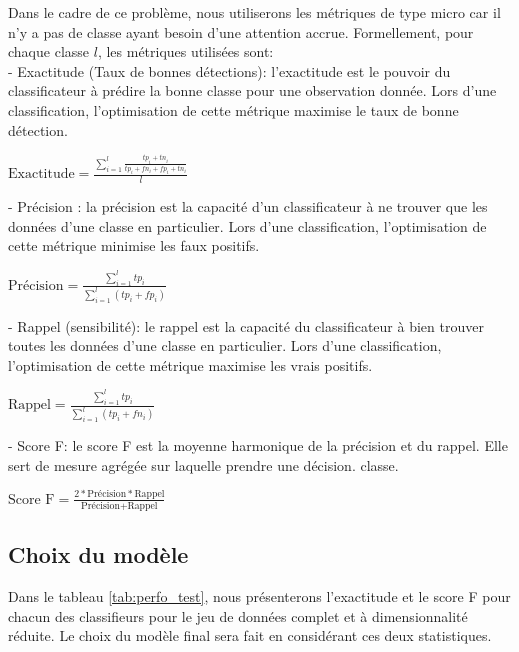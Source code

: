 Dans le cadre de ce problème, nous utiliserons les métriques de type micro car il n'y a pas de classe ayant besoin d'une attention accrue. Formellement, pour chaque classe $l$, les métriques utilisées sont: \\

- Exactitude (Taux de bonnes détections): l'exactitude est le pouvoir du classificateur à prédire la bonne classe pour une observation donnée.  Lors d'une classification, l'optimisation de cette métrique maximise le taux de bonne détection.\\
\begin{center}
	$\textrm{Exactitude} = \frac{\sum_{i=1}^{l} \frac{tp_i +tn_i}{tp_i + fn_i + fp_i+ tn_i}}{l}$
\end{center}

- Précision : la précision est la capacité d'un classificateur à ne trouver que les données d'une classe en particulier. Lors d'une classification, l'optimisation de cette métrique minimise les faux positifs.\\
\begin{center}
	$\textrm{Précision} = \frac{\sum_{i=1}^{l} tp_i}{\sum_{i=1}^{l} (tp_i + fp_i)}$
\end{center}

- Rappel (sensibilité): le rappel est la capacité du classificateur à bien trouver toutes les données d'une classe en particulier. Lors d'une classification, l'optimisation de cette métrique maximise les vrais positifs.\\
\begin{center}
	$\textrm{Rappel} = \frac{\sum_{i=1}^{l} tp_i}{\sum_{i=1}^{l} (tp_i + fn_i)}$
\end{center}

- Score F: le score F est la moyenne harmonique de la précision et du rappel. Elle sert de mesure agrégée sur laquelle prendre une décision. classe.\\	
\begin{center}
	$\textrm{Score F} = \frac{2 * \textrm{Précision} * \textrm{Rappel}}{\textrm{Précision} + \textrm{Rappel}}$ 
\end{center}

\subsection{Choix du modèle}

Dans le tableau \ref{tab:perfo_test}, nous présenterons l'exactitude et le score F pour chacun des classifieurs pour le jeu de données complet et à dimensionnalité réduite. Le choix du modèle final sera fait en considérant ces deux statistiques. \\

